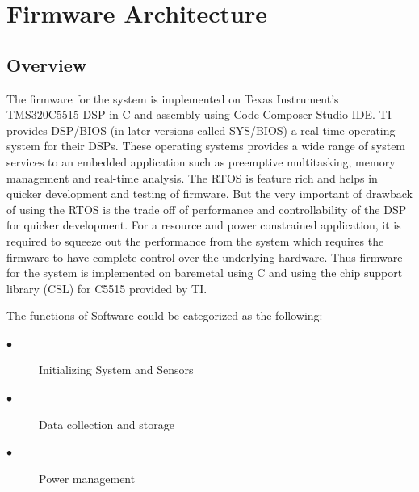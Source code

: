 \chapter{Firmware Architecture}

\section{Overview}
The firmware for the system is implemented on Texas Instrument's TMS320C5515 DSP in C and assembly using Code Composer Studio IDE. TI provides DSP/BIOS (in later versions called SYS/BIOS)  a real time operating system for their DSPs. These operating systems provides a wide range of system services to an embedded application such as preemptive multitasking, memory management and real-time analysis. The RTOS is feature rich and helps in quicker development and testing of firmware. But the very important of drawback of using the RTOS is the trade off of performance and controllability of the DSP for quicker development. For a resource and power constrained application, it is required to squeeze out the performance from the system which requires the firmware to have complete control over the underlying hardware. Thus firmware for the system is implemented on baremetal using  C and using the chip support library (CSL) for C5515 provided by TI. 


\vfill

The functions of Software could be categorized as the following:
 \begin{description}
 	\item[$\bullet$]
Initializing System and Sensors 
 	\item[$\bullet$]
Data collection and storage
 	\item[$\bullet$]  
Power management 
 \end{description}

